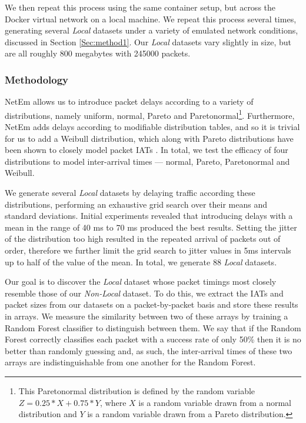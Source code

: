 \documentclass[sigconf]{acmart}
\begin{document}
We then repeat this process using the same container setup, but across the Docker virtual network on a local machine. We repeat this process several times, generating several \textit{Local} datasets under a variety of emulated network conditions, discussed in Section \ref{Sec:method1}. Our \textit{Local} datasets vary slightly in size, but are all roughly 800 megabytes with 245000 packets. %


\subsubsection*{Methodology}
\label{Sec:method1}


NetEm allows us to introduce packet delays according to a variety of distributions, namely uniform, normal, Pareto and Paretonormal\footnote{This Paretonormal distribution is defined by the random variable $Z = 0.25*X + 0.75*Y$, where $X$ is a random variable drawn from a normal distribution and $Y$ is a random variable drawn from a Pareto distribution.}. Furthermore, NetEm adds delays according to modifiable distribution tables, and so it is trivial for us to add a Weibull distribution, which along with Pareto distributions have been shown to closely model packet IATs \cite{arfeen2013role,paxson1995wide}.
In total, we test the efficacy of four distributions to model inter-arrival times --- normal, Pareto, Paretonormal and Weibull. 
 
We generate several \textit{Local} datasets by delaying traffic according these distributions, performing an exhaustive grid search over their means and standard deviations. Initial experiments revealed that introducing delays with a mean in the range of 40 ms to 70 ms produced the best results. Setting the jitter of the distribution too high resulted in the repeated arrival of packets out of order, therefore we further limit the grid search to jitter values in 5ms intervals up to half of the value of the mean. In total, we generate 88 \textit{Local} datasets.

Our goal is to discover the \textit{Local} dataset whose packet timings most closely resemble those of our \textit{Non-Local} dataset. To do this, we extract the IATs and packet sizes from our datasets on a packet-by-packet basis and store these results in arrays. We measure the similarity between two of these arrays by training a Random Forest classifier to distinguish between them. We say that if the Random Forest correctly classifies each packet with a success rate of only 50\% then it is no better than randomly guessing and, as such, the inter-arrival times of these two arrays are indistinguishable from one another for the Random Forest.
\end{document}
